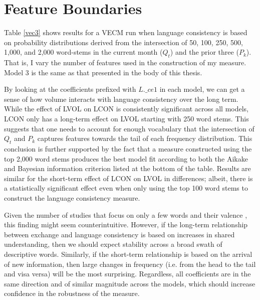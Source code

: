 \section{Feature Boundaries}

Table \ref{vec3} shows results for a VECM run when language consistency is based on probability distributions derived from the intersection of 50, 100, 250, 500, 1,000, and 2,000 word-stems in the current month ($Q_t$) and the prior three ($P_k$).  That is, I vary the number of features used in the construction of my measure. Model 3 is the same as that presented in the body of this thesis. 

By looking at the coefficients prefixed with $L.\_ce1$ in each model, we can get a sense of how volume interacts with language consistency over the long term. While the effect of LVOL on LCON is consistently significant across all models, LCON only has a long-term effect on LVOL starting with 250 word stems. This suggests that one needs to account for enough vocabulary that the intersection of $Q_t$ and $P_k$ captures features towards the tail of each frequency distribution. This conclusion is further supported by the fact that a measure constructed using the top 2,000 word stems produces the best model fit according to both the Aikake and Bayesian information criterion listed at the bottom of the table. Results are similar for the short-term effect of LCON on LVOL in differences; albeit, there is a statistically significant effect even when only using the top 100 word stems to construct the language consistency measure. 

Given the number of studies that focus on only a few words and their valence \citep[e.g.][]{trusov2009, xiong2013}, this finding might seem counterintuitive. However, if the long-term relationship between exchange and language consistency is based on increases in shared understanding, then we should expect stability across a broad swath of descriptive words. Similarly, if the short-term relationship is based on the arrival of new information, then large changes in frequency (i.e. from the head to the tail and visa versa) will be the most surprising. Regardless, all coefficients are in the same direction and of similar magnitude across the models, which should increase confidence in the robustness of the measure.

